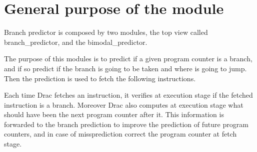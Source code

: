 \newpage
\section{General purpose of the module}

Branch predictor is composed by two modules, the top view called branch\_predictor, and the bimodal\_predictor.

The purpose of this modules is to predict if a given program counter is a branch, and if so predict if the branch is going to be taken and where is going to jump. Then the prediction is used to fetch the following instructions.

Each time Drac fetches an instruction, it verifies at execution stage if the fetched instruction is a branch. Moreover Drac also computes at execution stage what should have been the next program counter after it. This information is forwarded to the branch prediction to improve the prediction of future program counters, and in case of missprediction correct the program counter at fetch stage.